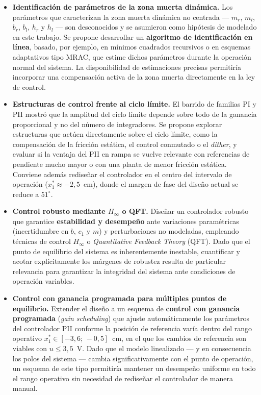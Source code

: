 \begin{itemize}
    \item \textbf{Identificación de parámetros de la zona muerta dinámica.}
    Los parámetros que caracterizan la zona muerta dinámica no centrada --- $m_r$, $m_l$,
    $b_r$, $b_l$, $h_r$ y $h_l$ --- son desconocidos y se asumieron como hipótesis de
    modelado en este trabajo. Se propone desarrollar un \textbf{algoritmo de identificación
    en línea}, basado, por ejemplo, en mínimos cuadrados recursivos o en esquemas
    adaptativos tipo MRAC, que estime dichos parámetros durante la operación normal del
    sistema. La disponibilidad de estimaciones precisas permitiría incorporar una
    compensación activa de la zona muerta directamente en la ley de control.

    \item \textbf{Estructuras de control frente al ciclo límite.}
    El barrido de familias PI y PII mostró que la amplitud del ciclo límite depende sobre todo
    de la ganancia proporcional y no del número de integradores. Se propone explorar
    estructuras que actúen directamente sobre el ciclo límite, como la compensación de la
    fricción estática, el control conmutado o el \textit{dither}, y evaluar si la ventaja del PII
    en rampa se vuelve relevante con referencias de pendiente mucho mayor o con una planta de
    menor fricción estática. Conviene además rediseñar el controlador en el centro del
    intervalo de operación ($x_1^*\approx-2{,}5$~cm), donde el margen de fase del diseño actual
    se reduce a $51^\circ$.

    \item \textbf{Control robusto mediante $H_\infty$ o QFT.}
    Diseñar un controlador robusto que garantice \textbf{estabilidad y desempeño} ante
    variaciones paramétricas (incertidumbre en $b$, $c_1$ y $m$) y perturbaciones no
    modeladas, empleando técnicas de control $H_\infty$ o \textit{Quantitative Feedback
    Theory} (QFT). Dado que el punto de equilibrio del sistema es inherentemente inestable,
    cuantificar y acotar explícitamente los márgenes de robustez resulta de particular
    relevancia para garantizar la integridad del sistema ante condiciones de operación
    variables.

    \item \textbf{Control con ganancia programada para múltiples puntos de equilibrio.}
    Extender el diseño a un esquema de \textbf{control con ganancia programada}
    (\textit{gain scheduling}) que ajuste automáticamente los parámetros del controlador
    PII conforme la posición de referencia varía dentro del rango operativo
    $x_1^* \in [-3{,}6;\,-0{,}5]$~cm, en el que los cambios de referencia son viables con $u\le 3{,}5$~V. Dado que el modelo linealizado --- y en consecuencia
    los polos del sistema --- cambia significativamente con el punto de operación, un
    esquema de este tipo permitiría mantener un desempeño uniforme en todo el rango operativo
    sin necesidad de rediseñar el controlador de manera manual.


\end{itemize}
